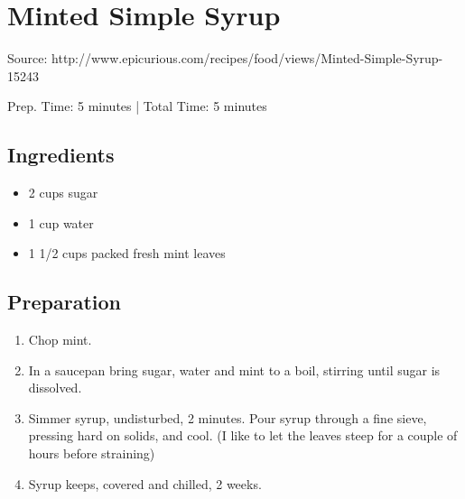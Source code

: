\section{Minted Simple Syrup}

Source: http://www.epicurious.com/recipes/food/views/Minted-Simple-Syrup-15243

Prep. Time: 5 minutes |
Total Time: 5 minutes

\subsection{Ingredients}
\begin{itemize}
    \item 2 cups sugar
    \item 1 cup water
    \item 1 1/2 cups packed fresh mint leaves
\end{itemize}

\subsection{Preparation}
\begin{enumerate}
    \item Chop mint.
    \item In a saucepan bring sugar, water and mint to a boil, stirring until sugar is dissolved.
    \item Simmer syrup, undisturbed, 2 minutes. Pour syrup through a fine sieve, pressing hard on solids, and cool. (I like to let the leaves steep for a couple of hours before straining)
    \item Syrup keeps, covered and chilled, 2 weeks. 
\end{enumerate}
